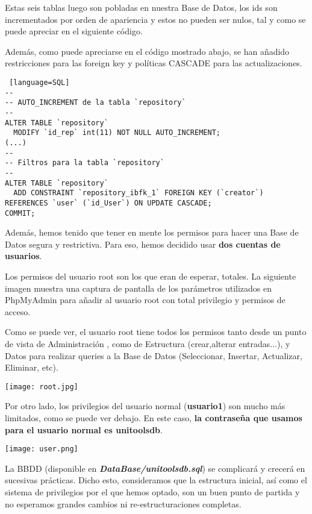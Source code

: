\documentclass[12pt]{report}
\begin{document}
Estas seis tablas luego son pobladas en nuestra Base de Datos, los ids son incrementados por orden de apariencia y estos no pueden ser nulos, tal y como se puede apreciar en el siguiente código.

Además, como puede apreciarse en el código mostrado abajo, se han añadido restricciones para las foreign key y políticas CASCADE para las actualizaciones.
\newline

\begin{lstlisting} [language=SQL]
--
-- AUTO_INCREMENT de la tabla `repository`
--
ALTER TABLE `repository`
  MODIFY `id_rep` int(11) NOT NULL AUTO_INCREMENT;
(...)
--
-- Filtros para la tabla `repository`
--
ALTER TABLE `repository`
  ADD CONSTRAINT `repository_ibfk_1` FOREIGN KEY (`creator`) REFERENCES `user` (`id_User`) ON UPDATE CASCADE;
COMMIT;
\end{lstlisting}

Además, hemos tenido que tener en mente los permisos para hacer una Base de Datos segura y restrictiva. Para eso, hemos decidido usar \textbf{dos cuentas de usuarios}.

Los permisos del usuario root son los que eran de esperar, totales. La siguiente imagen muestra una captura de pantalla de los parámetros utilizados en PhpMyAdmin para añadir al usuario root con total privilegio y permisos de acceso.

Como se puede ver, el usuario root tiene todos los permisos tanto desde un punto de vista de Administración , como de Estructura (crear,alterar entradas...), y Datos para realizar queries a la Base de Datos (Seleccionar, Insertar, Actualizar, Eliminar, etc).


\texttt{[image: root.jpg]}

Por otro lado, los privilegios del usuario normal (\textbf{usuario1}) son mucho más limitados, como se puede ver debajo. En este caso,\textbf{ la contraseña que usamos para el usuario normal es unitoolsdb}.

\texttt{[image: user.png]}

La BBDD (disponible en \textbf{\textit{DataBase/unitoolsdb.sql}}) se complicará y crecerá en sucesivas prácticas. Dicho esto, consideramos que la estructura inicial, así como el sistema de privilegios por el que hemos optado, son un buen punto de partida y no esperamos grandes cambios ni re-estructuraciones completas.
\end{document}
